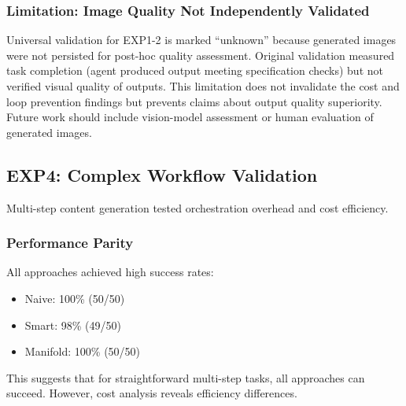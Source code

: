 \documentclass{article}
\begin{document}
\subsubsection{Limitation: Image Quality Not Independently Validated}
Universal validation for EXP1-2 is marked ``unknown'' because generated images were not persisted for post-hoc quality assessment. Original validation measured task completion (agent produced output meeting specification checks) but not verified visual quality of outputs.
This limitation does not invalidate the cost and loop prevention findings but prevents claims about output quality superiority. Future work should include vision-model assessment or human evaluation of generated images.

\subsection{EXP4: Complex Workflow Validation}
Multi-step content generation tested orchestration overhead and cost efficiency.

\subsubsection{Performance Parity}
All approaches achieved high success rates:
\begin{itemize}
\item Naive: 100\% (50/50)
\item Smart: 98\% (49/50)
\item Manifold: 100\% (50/50)
\end{itemize}
This suggests that for straightforward multi-step tasks, all approaches can succeed. However, cost analysis reveals efficiency differences.

\end{document}
